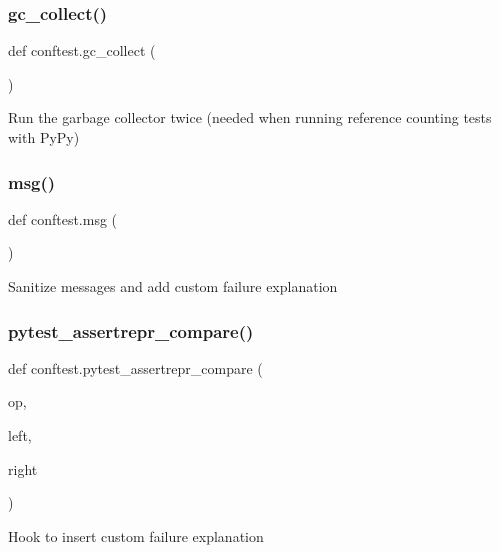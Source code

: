 \subsubsection{\texorpdfstring{gc\_collect()}{gc\_collect()}}
{\footnotesize\ttfamily def conftest.\+gc\+\_\+collect (\begin{DoxyParamCaption}{ }\end{DoxyParamCaption})}

\begin{DoxyVerb}Run the garbage collector twice (needed when running
reference counting tests with PyPy) \end{DoxyVerb}
 \mbox{\label{namespaceconftest_a8232d5538ccdf81352ae8d484548864e}} 
\subsubsection{\texorpdfstring{msg()}{msg()}}
{\footnotesize\ttfamily def conftest.\+msg (\begin{DoxyParamCaption}{ }\end{DoxyParamCaption})}

\begin{DoxyVerb}Sanitize messages and add custom failure explanation\end{DoxyVerb}
 \mbox{\label{namespaceconftest_ae323d6c25dca1e94101a23a65a3b2ba5}} 
\subsubsection{\texorpdfstring{pytest\_assertrepr\_compare()}{pytest\_assertrepr\_compare()}}
{\footnotesize\ttfamily def conftest.\+pytest\+\_\+assertrepr\+\_\+compare (\begin{DoxyParamCaption}\item[{}]{op,  }\item[{}]{left,  }\item[{}]{right }\end{DoxyParamCaption})}

\begin{DoxyVerb}Hook to insert custom failure explanation\end{DoxyVerb}
 \mbox{\label{namespaceconftest_abf6aaa58b0abe123198ba68fb26350d5}} 
